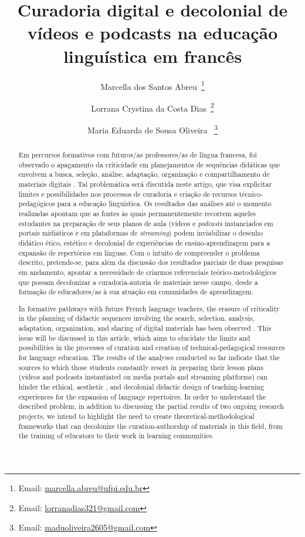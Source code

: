 \documentclass[portuguese]{textolivre}
\title{Curadoria digital e decolonial de vídeos e podcasts na educação linguística em francês}
\author[1]{Marcella dos Santos Abreu~\orcid{0000-0003-1293-4786}\thanks{Email: \href{mailto:marcella.abreu@ufpi.edu.br}{marcella.abreu@ufpi.edu.br}}}
\author[1]{Lorrana Crystina da Costa Dias~\orcid{0000-0001-9491-4353}\thanks{Email: \href{mailto:lorranadias321@gmail.com}{lorranadias321@gmail.com}}}
\author[1]{Maria Eduarda de Sousa Oliveira ~\orcid{0009-0008-1045-7107}\thanks{Email: \href{mailto:maduoliveira2605@gmail.com}{maduoliveira2605@gmail.com}}}
\affil[1]{Universidade Federal do Piauí, Centro de Ciências Humanas e Letras, Teresina, PI, Brasil.}
\begin{document}
\maketitle

\begin{polyabstract}
\begin{abstract}
Em percursos formativos com futuros/as professores/as de língua francesa, foi
observado o apagamento da criticidade em planejamentos de sequências didáticas
que envolvem a busca, seleção, análise, adaptação, organização e
compartilhamento de materiais digitais \cite{deschaine_five_2015}. Tal
problemática será discutida neste artigo, que visa explicitar limites e
possibilidades nos processos de curadoria e criação de recursos
técnico-pedagógicos para a educação linguística. Os resultados das análises até
o momento realizadas apontam que as fontes às quais permanentemente recorrem
aqueles estudantes na preparação de seus planos de aula (vídeos e
\textit{podcasts} instanciados em portais midiáticos e em plataformas de
\textit{streaming}) podem inviabilizar o desenho didático ético, estético
\cite{rocha_moocs_2019} e decolonial \cite{veronelli_sobre_2021} de
experiências de ensino-aprendizagem para a expansão de repertórios em línguas.
Com o intuito de compreender o problema descrito, pretende-se, para além da
discussão dos resultados parciais de duas pesquisas em andamento, apontar a
necessidade de criarmos referenciais teórico-metodológicos que possam
decolonizar a curadoria-autoria de materiais nesse campo, desde a formação de
educadores/as à sua atuação em comunidades de aprendizagem.

\end{abstract}

\begin{english}
\begin{abstract}
In formative pathways with future French language teachers, the erasure of
criticality in the planning of didactic sequences involving the search,
selection, analysis, adaptation, organization, and sharing of digital materials
has been observed \cite{deschaine_five_2015}. This issue will be discussed in
this article, which aims to elucidate the limits and possibilities in the
processes of curation and creation of technical-pedagogical resources for
language education. The results of the analyses conducted so far indicate that
the sources to which those students constantly resort in preparing their lesson
plans (videos and podcasts instantiated on media portals and streaming
platforms) can hinder the ethical, aesthetic \cite{rocha_moocs_2019}, and
decolonial \cite{veronelli_sobre_2021} didactic design of teaching-learning
experiences for the expansion of language repertoires. In order to understand
the described problem, in addition to discussing the partial results of two
ongoing research projects, we intend to highlight the need to create
theoretical-methodological frameworks that can decolonize the
curation-authorship of materials in this field, from the training of educators
to their work in learning communities.


\end{abstract}
\end{english}
\end{polyabstract}
\end{document}
